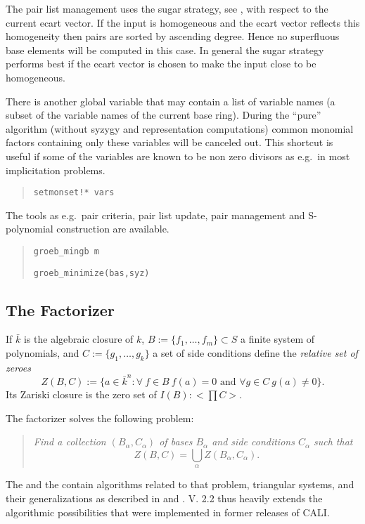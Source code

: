The pair list management uses the sugar strategy, see \cite{GMNRT},
with respect to the current ecart vector. If the input is homogeneous
and the ecart vector reflects this homogeneity then pairs are sorted
by ascending degree. Hence no superfluous base 
elements will be computed in this case. In general the sugar strategy
performs best if the ecart vector is chosen to make the input close
to be homogeneous.

There is another global variable  that may contain
a list of variable names (a subset of the variable names of the
current base ring). During the ``pure'' \gr algorithm (without syzygy
and representation computations) common monomial factors containing
only these variables will be canceled out. This shortcut is useful if
some of the variables are known to be non zero divisors as e.g.\ in
most implicitation problems.
\begin{quote}
\verb|setmonset!* vars|

\end{quote}

The \gr tools as e.g.\ pair criteria, pair list update, pair
management and S-polynomial construction are available. 
\begin{quote}
\verb|groeb_mingb m|


\verb|groeb_minimize(bas,syz)|

\end{quote}

\subsection{The \gr Factorizer}

If $\bar{k}$ is the algebraic closure of $k$,
$B:=\{f_1,\ldots,f_m\}\subset S$ a finite system of polynomials, and
$C:=\{g_1,\ldots,g_k\}$ a set of side conditions define the {\em
relative set of zeroes}   
\[Z(B,C):=\{a\in \bar{k}^n : \forall\ f\in B\ f(a)=0\mbox{ and }
\forall g\in C\ g(a)\neq 0\}.\]
Its Zariski closure is the zero set of $I(B):<\prod C>$. 

The \gr factorizer solves the following problem:
\begin{quote}
\it Find a collection $(B_\alpha,C_\alpha)$ of \gr bases $B_\alpha$
and side conditions $C_\alpha$ such that 
\[Z(B,C) = \bigcup_\alpha Z(B_\alpha,C_\alpha).\]
\end{quote}
The  and the  contain algorithms
related to that problem, triangular systems, and their generalizations
as described in \cite{fgb} and \cite{efgb}. V. 2.2 thus heavily
extends the algorithmic possibilities that were implemented in former
releases of CALI. 

